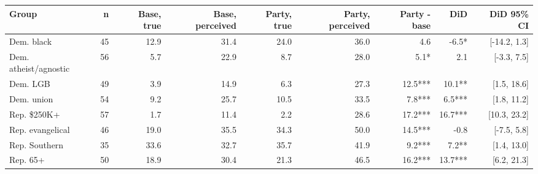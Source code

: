
\begin{tabular}{lrrrrrrrr}
\toprule
Group & n & Base, true & Base, perceived & Party, true & Party, perceived & Party - base & DiD & DiD 95\% CI\\
\midrule
Dem. black & 45 & 12.9 & 31.4 & 24.0 & 36.0 & 4.6 & -6.5* & {}[-14.2, 1.3]\\
Dem. atheist/agnostic & 56 & 5.7 & 22.9 & 8.7 & 28.0 & 5.1* & 2.1 & {}[-3.3, 7.5]\\
Dem. LGB & 49 & 3.9 & 14.9 & 6.3 & 27.3 & 12.5*** & 10.1** & {}[1.5, 18.6]\\
Dem. union & 54 & 9.2 & 25.7 & 10.5 & 33.5 & 7.8*** & 6.5*** & {}[1.8, 11.2]\\
Rep. \$250K+ & 57 & 1.7 & 11.4 & 2.2 & 28.6 & 17.2*** & 16.7*** & {}[10.3, 23.2]\\
Rep. evangelical & 46 & 19.0 & 35.5 & 34.3 & 50.0 & 14.5*** & -0.8 & {}[-7.5, 5.8]\\
Rep. Southern & 35 & 33.6 & 32.7 & 35.7 & 41.9 & 9.2*** & 7.2** & {}[1.4, 13.0]\\
Rep. 65+ & 50 & 18.9 & 30.4 & 21.3 & 46.5 & 16.2*** & 13.7*** & {}[6.2, 21.3]\\
\bottomrule
\end{tabular}
